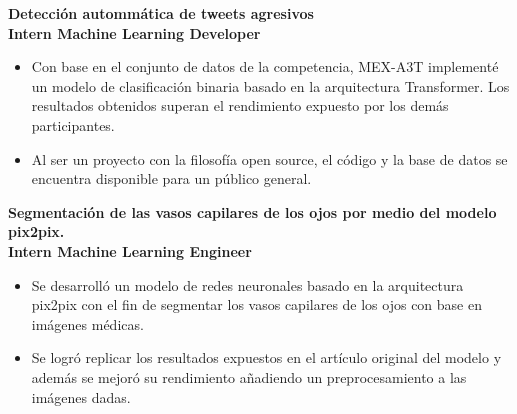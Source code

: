 \documentclass[a3paper]{adcv_color}
\newcommand{\proyect}[2]{
\textbf{#2}\\
{\color{linktext}	\textbf {#1}}
\vspace{-1cm}\\
}
\begin{document}
\proyect{Intern Machine Learning Developer}{Detección autommática de tweets agresivos}
\begin{itemize}
	\setlength\itemsep{0em}
	\item Con base en el conjunto de datos de la competencia, MEX-A3T implementé un modelo de clasificación binaria basado en la arquitectura Transformer. Los resultados obtenidos superan el rendimiento expuesto por los demás participantes.
	\item  Al ser un proyecto con la filosofía open source, el código y la base de datos se encuentra disponible para un público general.
\end{itemize}
\proyect{Intern Machine Learning Engineer}{Segmentación de las vasos capilares de los ojos por medio del modelo pix2pix.}
\begin{itemize}
	\setlength\itemsep{0em}
	\item Se desarrolló un modelo de redes neuronales basado en la arquitectura pix2pix con el fin de segmentar los vasos capilares de los ojos con base en imágenes médicas.
	\item Se logró replicar los resultados expuestos en el artículo original del modelo y además se mejoró su rendimiento añadiendo un preprocesamiento a las imágenes dadas.
\end{itemize}





\end{document}
